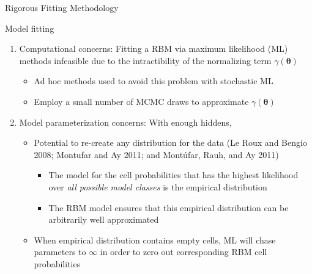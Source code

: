\documentclass[ignorenonframetext,]{beamer}
\providecommand{\tightlist}{%
  \setlength{\itemsep}{0pt}\setlength{\parskip}{0pt}}
\theoremstyle{definition}
\begin{document}
\begin{frame}{}
\protect\hypertarget{section-1}{}

\begin{center}
\Huge{Rigorous Fitting Methodology}
\end{center}

\end{frame}

\begin{frame}{Model fitting}
\protect\hypertarget{model-fitting}{}

\begin{enumerate}
\tightlist
\item
  Computational concerns: Fitting a RBM via maximum likelihood (ML)
  methods infeasible due to the intractibility of the normalizing term
  \(\gamma(\boldsymbol \theta)\)

  \begin{itemize}
  \tightlist
  \item
    Ad hoc methods used to avoid this problem with stochastic ML
  \item
    Employ a small number of MCMC draws to approximate
    \(\gamma(\boldsymbol \theta)\)
  \end{itemize}
\item
  Model parameterization concerns: With enough hiddens,

  \begin{itemize}
  \tightlist
  \item
    Potential to re-create any distribution for the data (Le Roux and
    Bengio 2008; Montufar and Ay 2011; and Montúfar, Rauh, and Ay 2011)

    \begin{itemize}
    \tightlist
    \item
      The model for the cell probabilities that has the highest
      likelihood over \emph{all possible model classes} is the empirical
      distribution
    \item
      The RBM model ensures that this empirical distribution can be
      arbitrarily well approximated
    \end{itemize}
  \item
    When empirical distribution contains empty cells, ML will chase
    parameters to \(\infty\) in order to zero out corresponding RBM cell
    probabilities
  \end{itemize}
\end{enumerate}

\end{frame}
\end{document}
